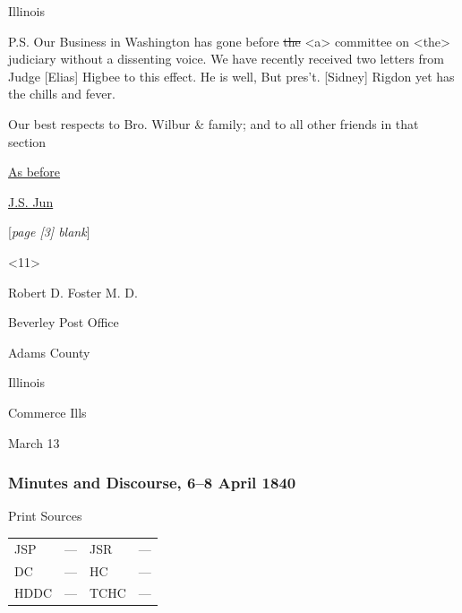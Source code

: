 				Illinois

				P.S. Our Business in Washington has gone before \sout{the} <a> committee on <the> judiciary without a dissenting voice. We have recently received two letters from Judge [Elias] Higbee to this effect. He is well, But pres't. [Sidney] Rigdon yet has the chills and fever.

				\begin{tightright}
					Our best respects to Bro. Wilbur \& family; and to all other friends in that section
					
					\uline{As before}

					\uline{J.S. Jun}
				\end{tightright}


				[\textit{page [3] blank}]

				\begin{tightright}
					<11>
				\end{tightright}

				\begin{tightcenter}
					Robert D. Foster M. D.
				\end{tightcenter}

				\begin{tightright}
					Beverley Post Office

					Adams County

					Illinois
				\end{tightright}

				Commerce Ills
				
				March 13
				
		\subsubsection{Minutes and Discourse, 6--8 April 1840}
			\label{EMS-1840-JS-6-8-APR-1840}
			
			\begin{description}
				\item[Print Sources]
			\end{description}

			\begin{tabular}{p{0.5in}p{1in}p{0.5in}p{1in}}
				JSP	 	& ---		& JSR 		& --- \\
				DC	 	& ---		& HC 		& --- \\
				HDDC 	& ---		& TCHC 		& --- \\
			\end{tabular}
			
